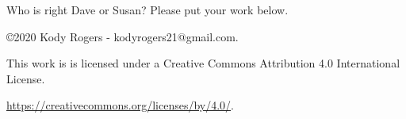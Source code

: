 \documentclass[12pt]{article}
\begin{document}
Who is right Dave or Susan? Please put your work below.

\parbox[][6cm][t]{8cm}{}




\begin{flushleft}
    \copyright  2020 Kody Rogers - kodyrogers21@gmail.com.

    This work is is licensed under a Creative Commons Attribution 4.0 International License.

    \url{https://creativecommons.org/licenses/by/4.0/}.
\end{flushleft}

\end{document}
